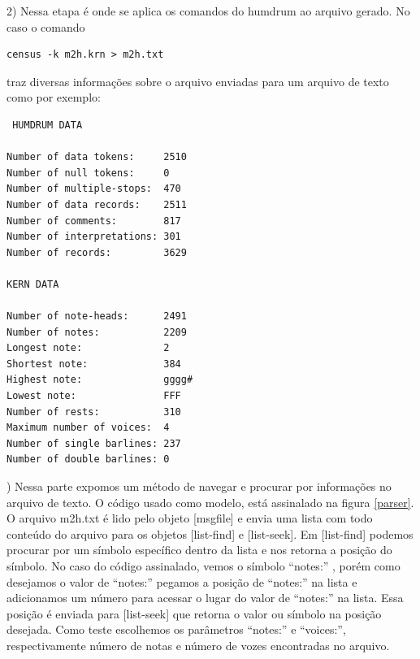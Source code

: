 \documentclass{ppgmus}
\begin{document}
2) Nessa etapa é onde se aplica os comandos do humdrum ao 
arquivo gerado. No caso o comando
\singlespacing
\footnotesize
\begin{verbatim}
census -k m2h.krn > m2h.txt
\end{verbatim}
\normalsize
\doublespacing 
traz diversas informações sobre o arquivo enviadas para um 
arquivo de texto como por exemplo:
\singlespacing
\footnotesize
\begin{verbatim}
 HUMDRUM DATA

Number of data tokens:     2510
Number of null tokens:     0
Number of multiple-stops:  470
Number of data records:    2511
Number of comments:        817
Number of interpretations: 301
Number of records:         3629

KERN DATA

Number of note-heads:      2491
Number of notes:           2209
Longest note:              2
Shortest note:             384
Highest note:              gggg#
Lowest note:               FFF
Number of rests:           310
Maximum number of voices:  4
Number of single barlines: 237
Number of double barlines: 0
\end{verbatim} 
\normalsize
{}) Nessa parte expomos um método de navegar e procurar por
informações no arquivo de texto. O código usado como modelo,
está assinalado na figura \ref{parser}. O arquivo m2h.txt
é lido pelo objeto [msgfile] e envia uma lista com todo conteúdo
do arquivo para os objetos [list-find] e [list-seek]. Em [list-find]
podemos procurar por um símbolo específico dentro da lista e nos retorna
a posição do símbolo. No caso do código assinalado, vemos o símbolo 
``notes:'' , porém como desejamos o valor de ``notes:'' pegamos a posição
de ``notes:'' na lista e adicionamos um número para acessar o lugar do valor de
``notes:'' na lista. Essa posição é enviada para [list-seek] que retorna o valor ou
símbolo na posição desejada. Como teste escolhemos os parâmetros ``notes:'' e ``voices:'', 
respectivamente número de notas e número de vozes encontradas no arquivo.
\end{document}
